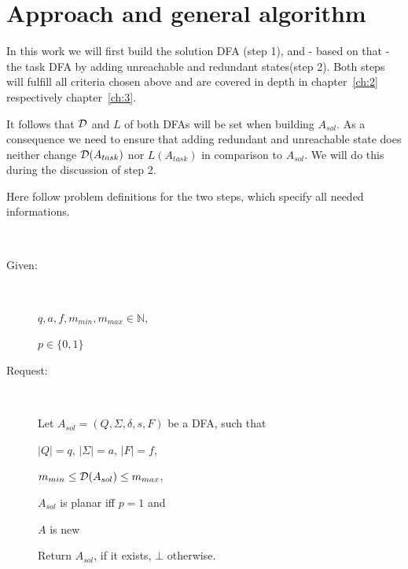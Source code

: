 \section{Approach and general algorithm}

In this work we will first build the solution DFA (step 1), and - based on that - the task DFA by adding unreachable and redundant states(step 2). Both steps will fulfill all criteria chosen above and are covered in depth in chapter~\ref{ch:2} respectively chapter~\ref{ch:3}.

It follows that $\mathcal{D}$ and $L$ of both DFAs will be set when building $A_{sol}$. As a consequence we need to ensure that adding redundant and unreachable state does neither change $\mathcal{D}(A_{task})$ nor $L(A_{task})$ in comparison to $A_{sol}$. We will do this during the discussion of step 2.

Here follow problem definitions for the two steps, which specify all needed informations.  %

\begin{definition}[BuildNewMinimalDFA] \label{ch:1:def:BuildNewMinimalDFA} $ $
	\begin{description}
		
		\item[Given:] $ $
		
		$q, a, f, m_{min}, m_{max} \in \mathbb{N},$
		
		$p \in \{0,1\}$
		\item[Request:] $ $
		
		Let $A_{sol} = (Q, \Sigma, \delta, s, F)$ be a DFA, such that
		
		\qquad $|Q|=q$, $|\Sigma|=a$, $|F|=f$,
		
		\qquad $m_{min} \le \mathcal{D}(A_{sol}) \le m_{max}$,
		
		\qquad $A_{sol}$ is planar iff $p = 1$ and
		
		\qquad $A$ is new
		
		Return $A_{sol}$, if it exists, $\bot$ otherwise.
	\end{description}
\end{definition}

